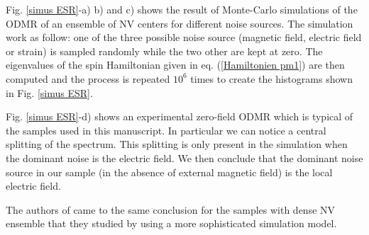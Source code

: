 \documentclass[a4paper, 11pt]{report}
\begin{document}
%

Fig. \ref{simus ESR}-a) b) and c) shows the result of Monte-Carlo simulations of the ODMR of an ensemble of NV centers for different noise sources. The simulation work as follow: one of the three possible noise source (magnetic field, electric field or strain) is sampled randomly while the two other are kept at zero. The eigenvalues of the spin Hamiltonian given in eq. (\ref{Hamiltonien pm1}) are then computed and the process is repeated $10^6$ times to create the histograms shown in Fig. \ref{simus ESR}.

Fig. \ref{simus ESR}-d) shows an experimental zero-field ODMR which is typical of the samples used in this manuscript. In particular we can notice a central splitting of the spectrum. This splitting is only present in the simulation when the dominant noise is the electric field. We then conclude that the dominant noise source in our sample (in the absence of external magnetic field) is the local electric field.

The authors of \citep{mittiga2018imaging} came to the same conclusion for the samples with dense NV ensemble that they studied by using a more sophisticated simulation model.

\end{document}
